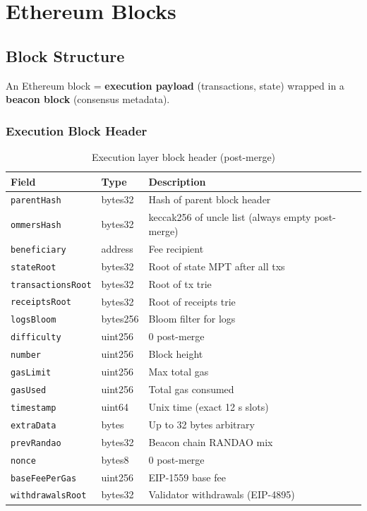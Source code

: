 \documentclass[12pt,a4paper,openany]{book}
\theoremstyle{definition}
\theoremstyle{plain}
\theoremstyle{remark}
\begin{document}
\chapter{Ethereum Blocks}
\label{chap:ethblocks}

\section{Block Structure}

An Ethereum block = \textbf{execution payload} (transactions, state)
wrapped in a \textbf{beacon block} (consensus metadata).

\subsection{Execution Block Header}

\begin{table}[h]
\centering
\caption{Execution layer block header (post-merge)}
\begin{tabular}{lll}
\toprule
\textbf{Field} & \textbf{Type} & \textbf{Description} \\
\midrule
\texttt{parentHash}       & bytes32  & Hash of parent block header \\
\texttt{ommersHash}       & bytes32  & keccak256 of uncle list (always empty post-merge) \\
\texttt{beneficiary}      & address  & Fee recipient \\
\texttt{stateRoot}        & bytes32  & Root of state MPT after all txs \\
\texttt{transactionsRoot} & bytes32  & Root of tx trie \\
\texttt{receiptsRoot}     & bytes32  & Root of receipts trie \\
\texttt{logsBloom}        & bytes256 & Bloom filter for logs \\
\texttt{difficulty}       & uint256  & 0 post-merge \\
\texttt{number}           & uint256  & Block height \\
\texttt{gasLimit}         & uint256  & Max total gas \\
\texttt{gasUsed}          & uint256  & Total gas consumed \\
\texttt{timestamp}        & uint64   & Unix time (exact 12 s slots) \\
\texttt{extraData}        & bytes    & Up to 32 bytes arbitrary \\
\texttt{prevRandao}       & bytes32  & Beacon chain RANDAO mix \\
\texttt{nonce}            & bytes8   & 0 post-merge \\
\texttt{baseFeePerGas}    & uint256  & EIP-1559 base fee \\
\texttt{withdrawalsRoot}  & bytes32  & Validator withdrawals (EIP-4895) \\
\bottomrule
\end{tabular}
\end{table}
\end{document}
